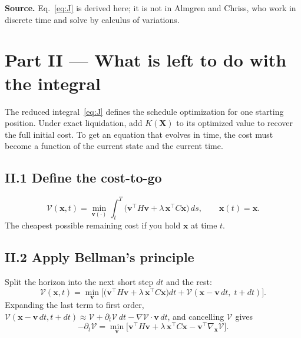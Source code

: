 \documentclass[11pt,a4paper]{article}
\begin{document}
\textbf{Source.} Eq.~\eqref{eq:J} is derived here; it is not in Almgren and
Chriss, who work in discrete time and solve by calculus of variations.

\section*{Part II --- What is left to do with the integral}

The reduced integral~\eqref{eq:J} defines the schedule optimization for one
starting position. Under exact liquidation, add $K(\mathbf X)$ to its optimized
value to recover the full initial cost.
To get an equation that evolves in time, the cost must become a function of the
current state and the current time.

\subsection*{II.1 Define the cost-to-go}

\begin{equation}
  \mathcal{V}(\mathbf{x},t)=\min_{\mathbf{v}(\cdot)}\int_t^T
  \Big(\mathbf{v}^\top H\mathbf{v}+\lambda\,\mathbf{x}^\top C\mathbf{x}\Big)\,ds,
  \qquad \mathbf{x}(t)=\mathbf{x}.
\end{equation}
The cheapest possible remaining cost if you hold $\mathbf{x}$ at time $t$.

\subsection*{II.2 Apply Bellman's principle}

Split the horizon into the next short step $dt$ and the rest:
\begin{equation}
  \mathcal{V}(\mathbf{x},t)=\min_{\mathbf{v}}\Big[\big(\mathbf{v}^\top H\mathbf{v}
  +\lambda\,\mathbf{x}^\top C\mathbf{x}\big)dt+\mathcal{V}(\mathbf{x}-\mathbf{v}\,dt,\;t+dt)\Big].
\end{equation}
Expanding the last term to first order,
$\mathcal{V}(\mathbf{x}-\mathbf{v}\,dt,t+dt)\approx\mathcal{V}+\partial_t\mathcal{V}\,dt-\nabla\mathcal{V}\cdot\mathbf{v}\,dt$,
and cancelling $\mathcal{V}$ gives
\begin{equation}
  -\partial_t\mathcal{V}=\min_{\mathbf{v}}\Big[\mathbf{v}^\top H\mathbf{v}
  +\lambda\,\mathbf{x}^\top C\mathbf{x}-\mathbf{v}^\top\nabla_{\mathbf{x}}\mathcal{V}\Big].
\end{equation}
\end{document}
